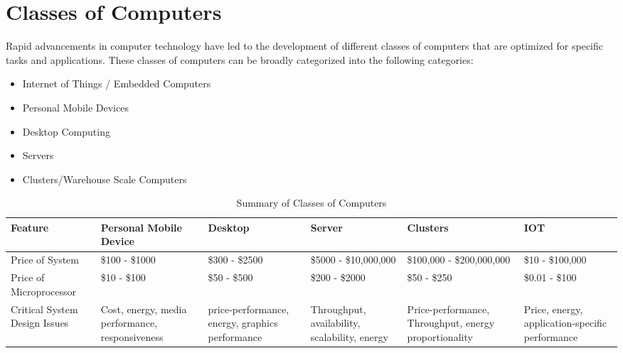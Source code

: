 \documentclass[12pt letter]{report}
\begin{document}
\chapter{Classes of Computers}

Rapid advancements in computer technology have led to the development of different classes of computers that are optimized
for specific tasks and applications. These classes of computers can be broadly categorized into the following categories:
\begin{itemize}
  \item Internet of Things / Embedded Computers
  \item Personal Mobile Devices
  \item Desktop Computing
  \item Servers
  \item Clusters/Warehouse Scale Computers
\end{itemize}

\begin{table}[htpb]
  \centering
  \begin{tabular}{|p{2cm}|p{2.5cm}|p{2.5cm}|p{2.5cm}|p{2.5cm}|p{2.5cm}|}
    \hline
    \textbf{Feature}              & \textbf{Personal Mobile Device}                 & \textbf{Desktop}                      & \textbf{Server}       &
    \textbf{Clusters}             & \textbf{IOT}                                                                                                                   \\ [0.5ex]
    \hline
    \hline
    Price of System               & \$100 - \$1000                                  & \$300 - \$2500                        & \$5000 - \$10,000,000 & \$100,000 -
    \$200,000,000                 & \$10 - \$100,000                                                                                                               \\
    \hline
    Price of Microprocessor       & \$10 - \$100                                    & \$50 - \$500                          & \$200 - \$2000        & \$50 - \$250
                                  & \$0.01 - \$100                                                                                                                 \\
    \hline
    Critical System Design Issues & Cost, energy, media performance, responsiveness & price-performance, energy,
    graphics performance          & Throughput, availability, scalability, energy   & Price-performance, Throughput, energy
    proportionality               & Price, energy, application-specific performance                                                                                \\
    \hline
  \end{tabular}
  \caption{Summary of Classes of Computers}\label{tab:classes}
\end{table}
\end{document}
